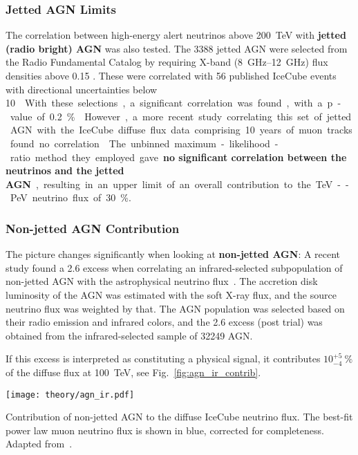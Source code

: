 \subsubsection{Jetted AGN Limits}

The correlation between high-energy alert neutrinos above \SI{200}{\tera\eV} with \textbf{jetted (radio bright) AGN} was also tested. The 3388 jetted AGN were selected from the Radio Fundamental Catalog by requiring X-band (\SIrange{8}{12}{\giga\Hz}) flux densities above 0.15 \unit{\jansky}. These were correlated with 56 published IceCube events with directional uncertainties below \SI{10}{\square\deg}. With these selections, a significant correlation was found, with a p-value of \SI{0.2}{\percent}~.

However, a more recent study correlating this set of jetted AGN with the IceCube diffuse flux data comprising 10 years of muon tracks found no correlation~. The unbinned maximum-likelihood-ratio method they employed gave \textbf{no significant correlation between the neutrinos and the jetted AGN}, resulting in an upper limit of an overall contribution to the \unit{\tera\eV}--\unit{\peta\eV} neutrino flux of \SI{30}{\percent}.

\subsubsection{Non-jetted AGN Contribution}

The picture changes significantly when looking at \textbf{non-jetted AGN}: A recent study found a \SI{2.6}{\sigma} excess when correlating an infrared-selected subpopulation of non-jetted AGN with the astrophysical neutrino flux~. The accretion disk luminosity of the AGN was estimated with the soft X-ray flux, and the source neutrino flux was weighted by that. The AGN population was selected based on their radio emission and infrared colors, and the \SI{2.6}{\sigma} excess (post trial) was obtained from the infrared-selected sample of 32249 AGN\@.

If this excess is interpreted as constituting a physical signal, it contributes $10^{+5}_{-4} ~\%$ of the diffuse flux at \SI{100}{\tera\eV}, see Fig.~\ref{fig:agn_ir_contrib}.

\begin{marginfigure}
    \texttt{[image: theory/agn\_ir.pdf]}
    \caption[Non-jetted AGN]{Contribution of non-jetted AGN to the diffuse IceCube neutrino flux. The best-fit power law muon neutrino flux is shown in blue, corrected for completeness. Adapted from~\cite{Abbasi2022c}.}
\end{marginfigure}

